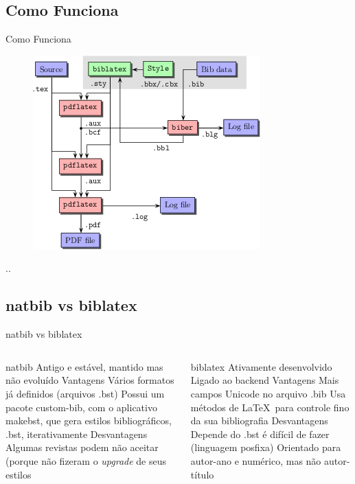 \documentclass{beamer}
\begin{document}
\subsection{Como Funciona}
\begin{frame}{Como Funciona}
    \begin{figure}
        \centering
        \includegraphics[width=0.7\linewidth]{Images/xMUL7}
        \caption{}
        \label{fig:xmul7}
    \end{figure}
    ..
\end{frame}

\subsection{natbib vs biblatex}
\begin{frame}[shrink=10]{natbib vs biblatex\cite{biber:2012}}
    \begin{columns}
        \begin{column}{0.5\linewidth}
\begin{outline}
    \1 natbib
    \2 Antigo e estável, mantido mas não evoluído
    \2 Vantagens
    \3 Vários formatos já definidos (arquivos .bst)
    \3 Possui um pacote custom-bib, com o aplicativo makebst, que gera estilos bibliográficos, .bst, iterativamente
    \2 Desvantagens
    \3 Algumas revistas podem não aceitar (porque não fizeram o \textit{upgrade} de seus estilos
\end{outline}
        \end{column}
    \begin{column}{0.5\linewidth}
\begin{outline}
    \1 biblatex
    \2 Ativamente desenvolvido
    \2 Ligado ao backend 
    \2 Vantagens
    \3 Mais campos
    \3 Unicode no arquivo .bib
    \3 Usa métodos de \LaTeX\ para controle fino da sua bibliografia
    \2 Desvantagens
    \3 Depende do  
    \3 .bst é difícil de fazer (linguagem posfixa)
    \3 Orientado para autor-ano e numérico, mas não autor-título
\end{outline}
    \end{column}
    \end{columns}

\end{frame}
\end{document}
